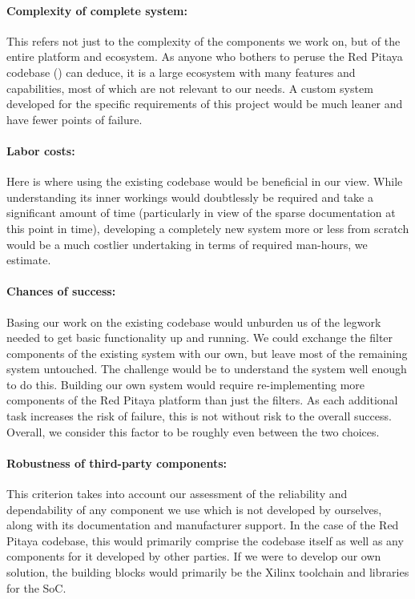 \paragraph{Complexity  of  complete  system:} This  refers  not  just  to  the
complexity  of  the  components  we  work  on,  but  of  the  entire  platform
and  ecosystem. As  anyone who  bothers  to  peruse  the Red  Pitaya  codebase
(\cite{pita:github}) can  deduce, it is  a large ecosystem with  many features
and capabilities, most of which are not relevant to our needs. A custom system
developed for the  specific requirements of this project would  be much leaner
and have fewer points of failure.

\paragraph{Labor  costs:} Here  is where  using  the  existing codebase  would
be  beneficial  in our  view. While  understanding  its inner  workings  would
doubtlessly be required and take a significant amount of time (particularly in
view  of  the sparse  documentation  at  this  point  in time),  developing  a
completely  new system  more or  less from  scratch would  be a  much costlier
undertaking in terms of required man-hours, we estimate.

\paragraph{Chances of success:} Basing our work on the existing codebase would
unburden  us  of  the  legwork  needed  to  get  basic  functionality  up  and
running. We could exchange  the filter components of the  existing system with
our own, but leave most of the remaining system untouched. The challenge would
be to understand the  system well enough to do this.   Building our own system
would require re-implementing more components  of the Red Pitaya platform than
just the filters. As each additional task  increases the risk of failure, this
is not without  risk to the overall success. Overall, we  consider this factor
to be roughly even between the two choices.

\paragraph{Robustness  of third-party  components:} This criterion  takes into
account our assessment  of the reliability and dependability  of any component
we use which  is not developed by ourselves, along  with its documentation and
manufacturer  support. In the  case of  the  Red Pitaya  codebase, this  would
primarily  comprise the  codebase  itself as  well as  any  components for  it
developed  by other  parties. If  we were  to develop  our  own solution,  the
building blocks would primarily be the  Xilinx toolchain and libraries for the
SoC.

